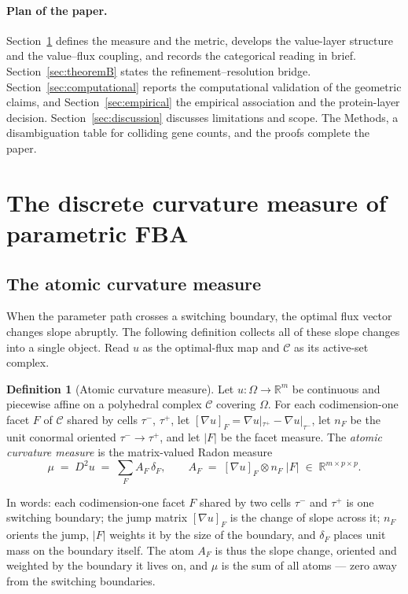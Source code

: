 \documentclass[11pt,a4paper]{article}
\theoremstyle{plain}
\theoremstyle{definition}
\newtheorem{definition}[theorem]{Definition}
\theoremstyle{remark}
\newcommand{\CC}{\mathcal{C}}
\newcommand{\RR}{\mathbb{R}}
\begin{document}
\paragraph{Plan of the paper.}
Section~\ref{sec:measure} defines the measure and the metric, develops
the value-layer structure and the value--flux coupling, and records the
categorical reading in brief. Section~\ref{sec:theoremB} states the
refinement--resolution bridge. Section~\ref{sec:computational} reports
the computational validation of the geometric claims, and
Section~\ref{sec:empirical} the empirical association and the
protein-layer decision. Section~\ref{sec:discussion} discusses
limitations and scope. The Methods, a disambiguation table for
colliding gene counts, and the proofs complete the paper.

\section{The discrete curvature measure of parametric FBA}
\label{sec:measure}



\subsection{The atomic curvature measure}

When the parameter path crosses a switching boundary, the optimal
flux vector changes slope abruptly. The following definition collects
all of these slope changes into a single object. Read $u$ as the
optimal-flux map and $\CC$ as its active-set complex.

\begin{definition}[Atomic curvature measure]\label{def:mu}
Let $u : \Omega \to \RR^m$ be continuous and piecewise affine on a
polyhedral complex $\CC$ covering $\Omega$. For each codimension-one facet
$F$ of $\CC$ shared by cells $\tau^-$, $\tau^+$, let
$[\nabla u]_F = \nabla u|_{\tau^+} - \nabla u|_{\tau^-}$, let $n_F$ be the
unit conormal oriented $\tau^- \to \tau^+$, and let $|F|$ be the facet
measure. The \emph{atomic curvature measure} is the matrix-valued Radon
measure
\[
\mu \;=\; D^2 u \;=\; \sum_{F} A_F \, \delta_F,
\qquad
A_F \;=\; [\nabla u]_F \otimes n_F \; |F| \;\in\; \RR^{m \times p \times p}.
\]
\end{definition}

In words: each codimension-one facet $F$ shared by two cells
$\tau^-$ and $\tau^+$ is one switching boundary; the jump matrix
$[\nabla u]_F$ is the change of slope across it; $n_F$ orients the
jump, $|F|$ weights it by the size of the boundary, and $\delta_F$
places unit mass on the boundary itself. The atom $A_F$ is thus the
slope change, oriented and weighted by the boundary it lives on, and
$\mu$ is the sum of all atoms --- zero away from the switching
boundaries.
\end{document}
